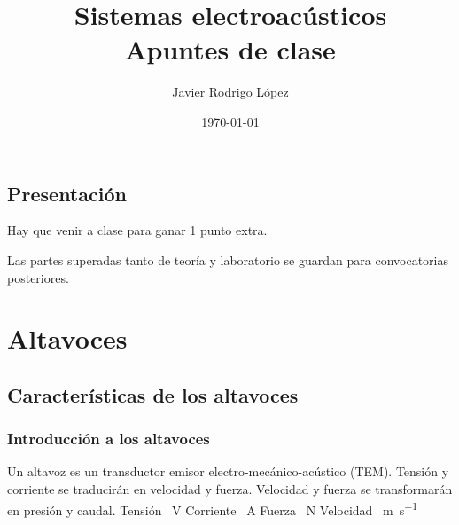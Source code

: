 \documentclass[10pt]{book}
\title{\Huge Sistemas electroacústicos\\\huge Apuntes de clase}
\author{Javier Rodrigo López}
\date{\today}
\begin{document}
\maketitle

\tableofcontents


\newpage

\section*{Presentación}

Hay que venir a clase para ganar 1 punto extra.

Las partes superadas tanto de teoría y laboratorio se guardan para convocatorias posteriores.

\newpage



\chapter{Altavoces}
\section{Características de los altavoces}

\subsection{Introducción a los altavoces}
Un altavoz es un transductor emisor electro-mecánico-acústico (TEM).
Tensión y corriente se traducirán en velocidad y fuerza. Velocidad y fuerza se transformarán en presión y caudal.
Tensión \SI{}{\volt}
Corriente \SI{}{\ampere}
Fuerza \SI{}{\newton}
Velocidad \SI{}{\metre\per\second}
\end{document}
